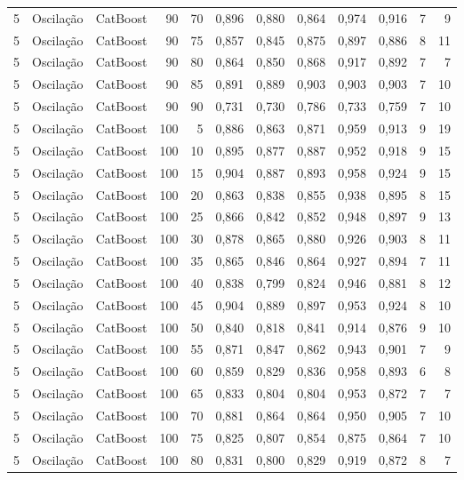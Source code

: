 \begin{longtable}{@{}rllrrrrrrrrr@{}}
5 & Oscilação & CatBoost & 90 & 70 & 0,896 & 0,880 & 0,864 & 0,974 & 0,916 & 7 & 9 \\
5 & Oscilação & CatBoost & 90 & 75 & 0,857 & 0,845 & 0,875 & 0,897 & 0,886 & 8 & 11 \\
5 & Oscilação & CatBoost & 90 & 80 & 0,864 & 0,850 & 0,868 & 0,917 & 0,892 & 7 & 7 \\
5 & Oscilação & CatBoost & 90 & 85 & 0,891 & 0,889 & 0,903 & 0,903 & 0,903 & 7 & 10 \\
5 & Oscilação & CatBoost & 90 & 90 & 0,731 & 0,730 & 0,786 & 0,733 & 0,759 & 7 & 10 \\
5 & Oscilação & CatBoost & 100 & 5 & 0,886 & 0,863 & 0,871 & 0,959 & 0,913 & 9 & 19 \\
5 & Oscilação & CatBoost & 100 & 10 & 0,895 & 0,877 & 0,887 & 0,952 & 0,918 & 9 & 15 \\
5 & Oscilação & CatBoost & 100 & 15 & 0,904 & 0,887 & 0,893 & 0,958 & 0,924 & 9 & 15 \\
5 & Oscilação & CatBoost & 100 & 20 & 0,863 & 0,838 & 0,855 & 0,938 & 0,895 & 8 & 15 \\
5 & Oscilação & CatBoost & 100 & 25 & 0,866 & 0,842 & 0,852 & 0,948 & 0,897 & 9 & 13 \\
5 & Oscilação & CatBoost & 100 & 30 & 0,878 & 0,865 & 0,880 & 0,926 & 0,903 & 8 & 11 \\
5 & Oscilação & CatBoost & 100 & 35 & 0,865 & 0,846 & 0,864 & 0,927 & 0,894 & 7 & 11 \\
5 & Oscilação & CatBoost & 100 & 40 & 0,838 & 0,799 & 0,824 & 0,946 & 0,881 & 8 & 12 \\
5 & Oscilação & CatBoost & 100 & 45 & 0,904 & 0,889 & 0,897 & 0,953 & 0,924 & 8 & 10 \\
5 & Oscilação & CatBoost & 100 & 50 & 0,840 & 0,818 & 0,841 & 0,914 & 0,876 & 9 & 10 \\
5 & Oscilação & CatBoost & 100 & 55 & 0,871 & 0,847 & 0,862 & 0,943 & 0,901 & 7 & 9 \\
5 & Oscilação & CatBoost & 100 & 60 & 0,859 & 0,829 & 0,836 & 0,958 & 0,893 & 6 & 8 \\
5 & Oscilação & CatBoost & 100 & 65 & 0,833 & 0,804 & 0,804 & 0,953 & 0,872 & 7 & 7 \\
5 & Oscilação & CatBoost & 100 & 70 & 0,881 & 0,864 & 0,864 & 0,950 & 0,905 & 7 & 10 \\
5 & Oscilação & CatBoost & 100 & 75 & 0,825 & 0,807 & 0,854 & 0,875 & 0,864 & 7 & 10 \\
5 & Oscilação & CatBoost & 100 & 80 & 0,831 & 0,800 & 0,829 & 0,919 & 0,872 & 8 & 7 \\

\end{longtable}
